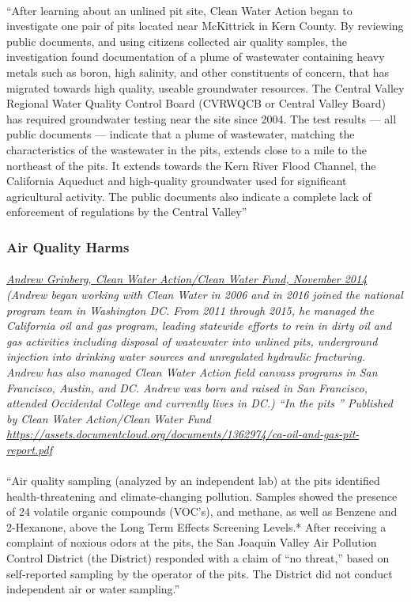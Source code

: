 \documentclass{article}
\begin{document}
\paragraph{}
``After learning about an unlined pit site, Clean Water Action began to investigate one pair of pits located near McKittrick in Kern County. By reviewing public documents, and using citizens collected air quality samples, the investigation found documentation of a plume of wastewater containing heavy metals such as boron, high salinity, and other constituents of concern, that has migrated towards high quality, useable groundwater resources. The Central Valley Regional Water Quality Control Board (CVRWQCB or Central Valley Board) has required groundwater testing near the site since 2004. The test results — all public documents — indicate that a plume of wastewater, matching the characteristics of the wastewater in the pits, extends close to a mile to the northeast of the pits. It extends towards the Kern River Flood Channel, the California Aqueduct and high-quality groundwater used for significant agricultural activity. The public documents also indicate a complete lack of enforcement of regulations by the Central Valley''

\subsubsection{Air Quality Harms}
\paragraph{}
\small
\textit{  
\underline{Andrew Grinberg, Clean Water Action/Clean Water Fund, November 2014}
  (Andrew began working with Clean Water in 2006 and in 2016 joined the national program team in Washington DC. From 2011 through 2015, he managed the California oil and gas program, leading statewide efforts to rein in dirty oil and gas activities including disposal of wastewater into unlined pits, underground injection into drinking water sources and unregulated hydraulic fracturing. Andrew has also managed Clean Water Action field canvass programs in San Francisco, Austin, and DC. Andrew was born and raised in San Francisco, attended Occidental College and currently lives in DC.) “In the pits ” Published by Clean Water Action/Clean Water Fund 
\url{https://assets.documentcloud.org/documents/1362974/ca-oil-and-gas-pit-report.pdf} }
\normalsize
\paragraph{}
``Air quality sampling (analyzed by an independent lab) at the pits identified health-threatening and climate-changing pollution. Samples showed the presence of 24 volatile organic compounds (VOC’s), and methane, as well as Benzene and 2-Hexanone, above the Long Term Effects Screening Levels.* After receiving a complaint of noxious odors at the pits, the San Joaquin Valley Air Pollution Control District (the District) responded with a claim of “no threat,” based on self-reported sampling by the operator of the pits. The District did not conduct independent air or water sampling.''
\end{document}
